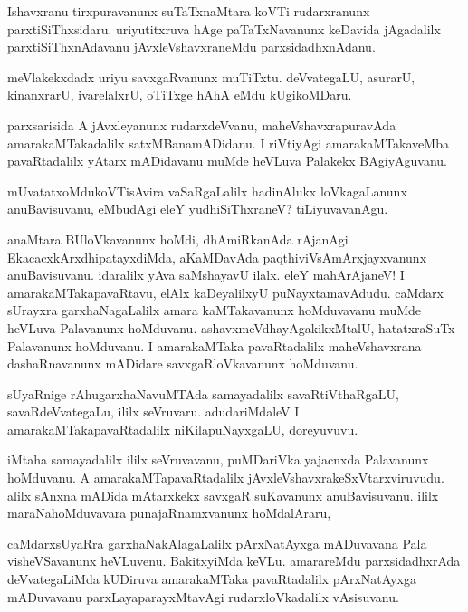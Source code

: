 \documentclass{article}
\begin{document}
\begin{mn}
Ishavxranu tirxpuravanunx suTaTxnaMtara koVTi rudarxranunx parxtiSiThxsidaru. uriyutitxruva hAge 
paTaTxNavanunx keDavida jAgadalilx parxtiSiThxnAdavanu jAvxleVshavxraneMdu parxsidadhxnAdanu.
\end{mn}

\begin{mn}
meVlakekxdadx uriyu savxgaRvanunx muTiTxtu. deVvategaLU, asurarU, kinanxrarU, ivarelalxrU, 
oTiTxge hAhA eMdu kUgikoMDaru.
\end{mn}

\begin{mn}
parxsarisida A jAvxleyanunx rudarxdeVvanu, maheVshavxrapuravAda amarakaMTakadalilx 
satxMBanamADidanu. I riVtiyAgi amarakaMTakaveMba pavaRtadalilx yAtarx mADidavanu muMde heVLuva 
Palakekx BAgiyAguvanu.
\end{mn}

\begin{mn}
mUvatatxoMdukoVTisAvira vaSaRgaLalilx hadinAlukx loVkagaLanunx anuBavisuvanu, eMbudAgi eleY 
yudhiSiThxraneV? tiLiyuvavanAgu.
\end{mn}

\begin{mn}
anaMtara BUloVkavanunx hoMdi, dhAmiRkanAda rAjanAgi EkacacxkArxdhipatayxdiMda, aKaMDavAda 
paqthiviVsAmArxjayxvanunx anuBavisuvanu. idaralilx yAva saMshayavU ilalx. eleY mahArAjaneV! 
I amarakaMTakapavaRtavu, elAlx kaDeyalilxyU puNayxtamavAdudu. caMdarx sUrayxra garxhaNagaLalilx 
amara kaMTakavanunx hoMduvavanu muMde heVLuva Palavanunx hoMduvanu. ashavxmeVdhayAgakikxMtalU, 
hatatxraSuTx Palavanunx hoMduvanu. I amarakaMTaka pavaRtadalilx maheVshavxrana dashaRnavanunx
mADidare savxgaRloVkavanunx hoMduvanu.
\end{mn}

\begin{mn}
sUyaRnige rAhugarxhaNavuMTAda samayadalilx savaRtiVthaRgaLU, savaRdeVvategaLu, ililx seVruvaru. 
adudariMdaleV I amarakaMTakapavaRtadalilx niKilapuNayxgaLU, doreyuvuvu.
\end{mn}

\begin{mn}
iMtaha samayadalilx ililx seVruvavanu, puMDariVka yajacnxda Palavanunx hoMduvanu. 
A amarakaMTapavaRtadalilx jAvxleVshavxrakeSxVtarxviruvudu. alilx sAnxna mADida mAtarxkekx 
savxgaR suKavanunx anuBavisuvanu. ililx maraNahoMduvavara punajaRnamxvanunx hoMdalAraru,
\end{mn}

\begin{mn}
caMdarxsUyaRra garxhaNakAlagaLalilx pArxNatAyxga mADuvavana Pala visheVSavanunx heVLuvenu. 
BakitxyiMda keVLu. amarareMdu parxsidadhxrAda deVvategaLiMda kUDiruva amarakaMTaka pavaRtadalilx
pArxNatAyxga mADuvavanu parxLayaparayxMtavAgi rudarxloVkadalilx vAsisuvanu.
\end{mn}
\end{document}
